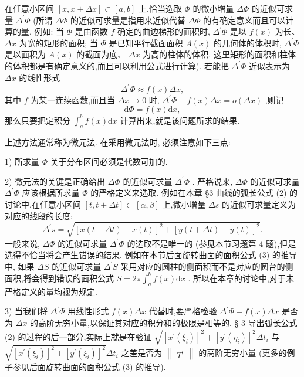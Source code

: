 在任意小区间 \(\left\lbrack  {x,x + {\Delta x}}\right\rbrack   \subset  \left\lbrack  {a,b}\right\rbrack\) 上,恰当选取 \(\Phi\) 的微小增量 \({\Delta \Phi }\) 的近似可求量 \({\Delta }^{\prime }\Phi\) (所谓 \({\Delta \Phi }\) 的近似可求量是指用来近似代替 \({\Delta \Phi }\) 的有确定意义而且可以计算的量. 例如: 当 \(\Phi\) 是由函数 \(f\) 确定的曲边梯形的面积时, \({\Delta }^{\prime }\Phi\) 是以 \(f\left( x\right)\) 为长、 \({\Delta x}\) 为宽的矩形的面积; 当 \(\Phi\) 是已知平行截面面积 \(A\left( x\right)\) 的几何体的体积时, \({\Delta }^{\prime }\Phi\) 是以面积为 \(A\left( x\right)\) 的截面为底、 \({\Delta x}\) 为高的柱体的体积. 这里矩形的面积和柱体的体积都是有确定意义的,而且可以利用公式进行计算). 若能把 \({\Delta }^{\prime }\Phi\) 近似表示为 \({\Delta x}\) 的线性形式
\[
{\Delta }^{\prime }\Phi  \approx  f\left( x\right) {\Delta x}, \tag{1}
\]
其中 \(f\) 为某一连续函数,而且当 \({\Delta x} \rightarrow  0\) 时, \({\Delta }^{\prime }\Phi  - f\left( x\right) {\Delta x} = o\left( {\Delta x}\right)\) ,则记
\[
\mathrm{d}\Phi  = f\left( x\right) \mathrm{d}x, \tag{2}
\]
那么只要把定积分 \({\int }_{a}^{b}f\left( x\right) \mathrm{d}x\) 计算出来,就是该问题所求的结果.

上述方法通常称为微元法. 在采用微元法时, 必须注意如下三点:

1) 所求量 \(\Phi\) 关于分布区间必须是代数可加的.

2) 微元法的关键是正确给出 \({\Delta \Phi }\) 的近似可求量 \({\Delta }^{\prime }\Phi\) . 严格说来, \({\Delta \Phi }\) 的近似可求量 \({\Delta }^{\prime }\Phi\) 应该根据所求量 \(\Phi\) 的严格定义来选取. 例如在本章 §3 曲线的弧长公式 (2) 的讨论中,在任意小区间 \(\left\lbrack  {t,t + {\Delta t}}\right\rbrack   \subset  \left\lbrack  {\alpha ,\beta }\right\rbrack\) 上,微小增量 \({\Delta s}\) 的近似可求量定义为对应的线段的长度:
\[
{\Delta }^{\prime }s = \sqrt{{\left\lbrack  x\left( t + \Delta t\right)  - x\left( t\right) \right\rbrack  }^{2} + {\left\lbrack  y\left( t + \Delta t\right)  - y\left( t\right) \right\rbrack  }^{2}}.
\]
一般来说, \({\Delta \Phi }\) 的近似可求量 \({\Delta }^{\prime }\Phi\) 的选取不是唯一的 (参见本节习题第 4 题),但是选得不恰当将会产生错误的结果. 例如在本节后面旋转曲面的面积公式 (3) 的推导中, 如果 \({\Delta S}\) 的近似可求量 \({\Delta }^{\prime }S\) 采用对应的圆柱的侧面积而不是对应的圆台的侧面积,将会得到错误的面积公式 \(S = {2\pi }{\int }_{a}^{b}f\left( x\right) \mathrm{d}x\) . 所以在本章的讨论中,对于未严格定义的量均视为规定.

3) 当我们将 \({\Delta }^{\prime }\Phi\) 用线性形式 \(f\left( x\right) {\Delta x}\) 代替时,要严格检验 \({\Delta }^{\prime }\Phi  - f\left( x\right) {\Delta x}\) 是否为 \({\Delta x}\) 的高阶无穷小量,以保证其对应的积分和的极限是相等的. § 3 导出弧长公式 (2) 的过程的后一部分,实际上就是在验证 \(\sqrt{{\left\lbrack  {x}^{\prime }\left( {\xi }_{i}\right) \right\rbrack  }^{2} + {\left\lbrack  {y}^{\prime }\left( {\eta }_{i}\right) \right\rbrack  }^{2}}\Delta {t}_{i}\) 与 \(\sqrt{{\left\lbrack  {x}^{\prime }\left( {\xi }_{i}\right) \right\rbrack  }^{2} + {\left\lbrack  {y}^{\prime }\left( {\xi }_{i}\right) \right\rbrack  }^{2}}\Delta {t}_{i}\) 之差是否为 \(\begin{Vmatrix}{T}^{\prime }\end{Vmatrix}\) 的高阶无穷小量 (更多的例子参见后面旋转曲面的面积公式 (3) 的推导).

